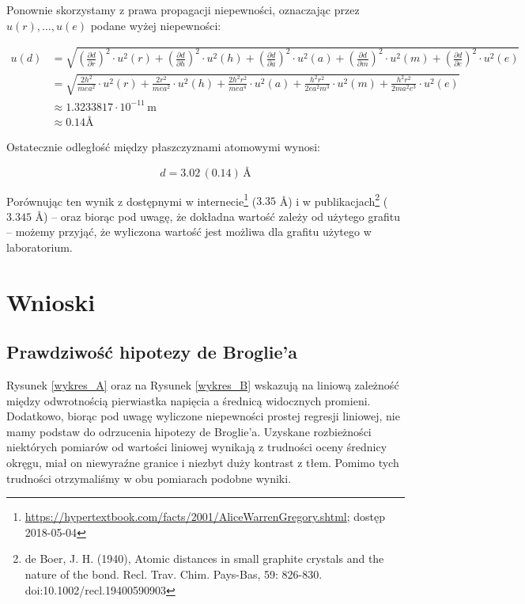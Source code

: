 \documentclass[a4paper]{article}
\newlength{\du}
\begin{document}
Ponownie skorzystamy z prawa propagacji niepewności, oznaczając przez $u(r), \dots, u(e)$ podane wyżej niepewności:

\begin{align*}
	u(d) &= \sqrt{
		\left( \frac{\partial d}{\partial r} \right)^2 \cdot u^2(r) +
		\left( \frac{\partial d}{\partial h} \right)^2 \cdot u^2(h) +
                \left( \frac{\partial d}{\partial a} \right)^2 \cdot u^2(a) +
                \left( \frac{\partial d}{\partial m} \right)^2 \cdot u^2(m) +
                \left( \frac{\partial d}{\partial e} \right)^2 \cdot u^2(e)
	} \\
	&= \sqrt{
		\frac{2h^2}{mea^2} \cdot u^2(r) +
		\frac{2r^2}{mea^2} \cdot u^2(h) +
		\frac{2h^2r^2}{mea^4} \cdot u^2(a) +
		\frac{h^2r^2}{2e a^2 m^3} \cdot u^2(m) +
		\frac{h^2r^2}{2m a^2 e^3} \cdot u^2(e)
	} \\
	&\approx 1.3233817 \cdot 10^{-11} \, \text{m} \\
	&\approx 0.14 \text{Å}
\end{align*}

Ostatecznie odległość między płaszczyznami atomowymi wynosi:

$$d = 3.02 \, (0.14) \, \text{Å}$$

Porównując ten wynik z dostępnymi w internecie\footnote{\url{https://hypertextbook.com/facts/2001/AliceWarrenGregory.shtml}; dostęp 2018-05-04}
($3.35$ Å)
i w publikacjach\footnote{de Boer, J. H. (1940), Atomic distances in small graphite crystals and the nature of the bond. Recl. Trav. Chim. Pays-Bas, 59: 826-830. doi:10.1002/recl.19400590903}
($3.345$ Å)
-- oraz biorąc pod uwagę, że dokładna wartość zależy od użytego grafitu --
możemy przyjąć, że wyliczona wartość jest możliwa dla grafitu użytego w laboratorium.

\section{Wnioski}

\subsection{Prawdziwość hipotezy de Broglie'a}

Rysunek \ref{wykres_A} oraz na Rysunek \ref{wykres_B} wskazują na liniową zależność między odwrotnością pierwiastka napięcia a średnicą widocznych promieni.
Dodatkowo, biorąc pod uwagę wyliczone niepewności prostej regresji liniowej, nie mamy podstaw do odrzucenia hipotezy de Broglie'a.
Uzyskane rozbieżności niektórych pomiarów od wartości liniowej wynikają z trudności oceny średnicy okręgu, miał on niewyraźne granice i niezbyt duży kontrast z tłem. Pomimo tych trudności otrzymaliśmy w obu pomiarach podobne wyniki.
\end{document}
